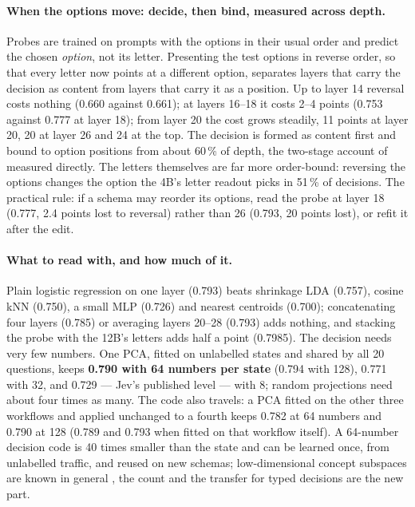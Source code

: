 \documentclass[11pt,a4paper]{article}
\begin{document}
\paragraph{When the options move: decide, then bind, measured across depth.} Probes are trained on prompts with the options in their usual order and predict the chosen \emph{option}, not its letter. Presenting the test options in reverse order, so that every letter now points at a different option, separates layers that carry the decision as content from layers that carry it as a position. Up to layer 14 reversal costs nothing (0.660 against 0.661); at layers 16--18 it costs 2--4 points (0.753 against 0.777 at layer 18); from layer 20 the cost grows steadily, 11 points at layer 20, 20 at layer 26 and 24 at the top. The decision is formed as content first and bound to option positions from about 60\,\% of depth, the two-stage account of \cite{twostage} measured directly. The letters themselves are far more order-bound: reversing the options changes the option the 4B's letter readout picks in 51\,\% of decisions. The practical rule: if a schema may reorder its options, read the probe at layer 18 (0.777, 2.4 points lost to reversal) rather than 26 (0.793, 20 points lost), or refit it after the edit.

\paragraph{What to read with, and how much of it.} Plain logistic regression on one layer (0.793) beats shrinkage LDA (0.757), cosine kNN (0.750), a small MLP (0.726) and nearest centroids (0.700); concatenating four layers (0.785) or averaging layers 20--28 (0.793) adds nothing, and stacking the probe with the 12B's letters adds half a point (0.7985). The decision needs very few numbers. One PCA, fitted on unlabelled states and shared by all 20 questions, keeps \textbf{0.790 with 64 numbers per state} (0.794 with 128), 0.771 with 32, and 0.729 --- Jev's published level --- with 8; random projections need about four times as many. The code also travels: a PCA fitted on the other three workflows and applied unchanged to a fourth keeps 0.782 at 64 numbers and 0.790 at 128 (0.789 and 0.793 when fitted on that workflow itself). A 64-number decision code is 40 times smaller than the state and can be learned once, from unlabelled traffic, and reused on new schemas; low-dimensional concept subspaces are known in general \cite{hernandez}, the count and the transfer for typed decisions are the new part.
\end{document}
